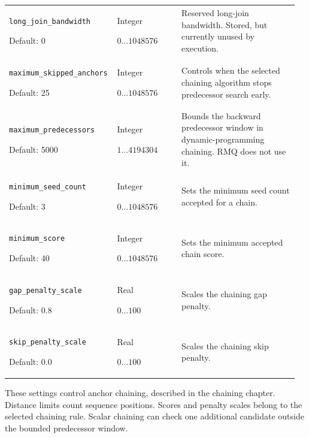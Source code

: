 \begin{longtable}{@{}>{\raggedright\arraybackslash}p{0.34\linewidth}>{\raggedright\arraybackslash}p{0.22\linewidth}>{\raggedright\arraybackslash}p{0.40\linewidth}@{}}
\nolinkurl{long_join_bandwidth}\par Default: 0 & Integer\par $0\ldots 1048576$ & Reserved long-join bandwidth. Stored, but currently unused by execution. \\[4pt]
\nolinkurl{maximum_skipped_anchors}\par Default: 25 & Integer\par $0\ldots 1048576$ & Controls when the selected chaining algorithm stops predecessor search early. \\[4pt]
\nolinkurl{maximum_predecessors}\par Default: 5000 & Integer\par $1\ldots 4194304$ & Bounds the backward predecessor window in dynamic-programming chaining. RMQ does not use it. \\[4pt]
\nolinkurl{minimum_seed_count}\par Default: 3 & Integer\par $0\ldots 1048576$ & Sets the minimum seed count accepted for a chain. \\[4pt]
\nolinkurl{minimum_score}\par Default: 40 & Integer\par $0\ldots 1048576$ & Sets the minimum accepted chain score. \\[4pt]
\nolinkurl{gap_penalty_scale}\par Default: 0.8 & Real\par $0\ldots 100$ & Scales the chaining gap penalty. \\[4pt]
\nolinkurl{skip_penalty_scale}\par Default: 0.0 & Real\par $0\ldots 100$ & Scales the chaining skip penalty. \\[4pt]
\end{longtable}
\endgroup

These settings control anchor chaining, described in the chaining chapter.
Distance limits count sequence positions. Scores and penalty scales belong
to the selected chaining rule. Scalar chaining can check one additional
candidate outside the bounded predecessor window.

